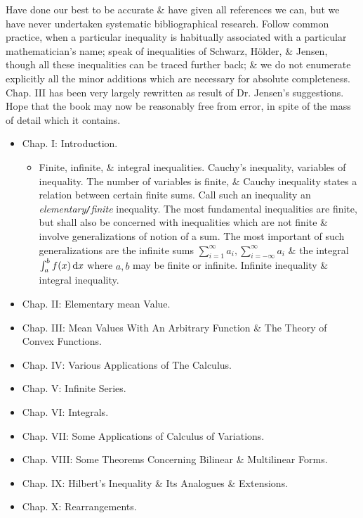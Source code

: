 \documentclass{article}
\begin{document}
\begin{enumerate}
	Have done our best to be accurate \& have given all references we can, but we have never undertaken systematic bibliographical research. Follow common practice, when a particular inequality is habitually associated with a particular mathematician's name; speak of inequalities of {\sc Schwarz, H\"older, \& Jensen}, though all these inequalities can be traced further back; \& we do not enumerate explicitly all the minor additions which are necessary for absolute completeness. Chap. III has been very largely rewritten as result of Dr. {\sc Jensen}'s suggestions. Hope that the book may now be reasonably free from error, in spite of the mass of detail which it contains.
	\begin{itemize}
		\item {\sf Chap. I: Introduction.}
		\begin{itemize}
			\item {\sf Finite, infinite, \& integral inequalities.} Cauchy's inequality, variables of inequality. The number of variables is finite, \& Cauchy inequality states a relation between certain finite sums. Call such an inequality an {\it elementary{\tt/}finite} inequality. The most fundamental inequalities are finite, but shall also be concerned with inequalities which are not finite \& involve generalizations of notion of a sum. The most important of such generalizations are the infinite sums $\sum_{i=1}^\infty a_i,\sum_{i=-\infty}^\infty a_i$ \& the integral $\int_a^b f(x)\,{\rm d}x$ where $a,b$ may be finite or infinite. Infinite inequality \& integral inequality.
		\end{itemize}
		\item {\sf Chap. II: Elementary mean Value.}
		\item {\sf Chap. III: Mean Values With An Arbitrary Function \& The Theory of Convex Functions.}
		\item {\sf Chap. IV: Various Applications of The Calculus.}
		\item {\sf Chap. V: Infinite Series.}
		\item {\sf Chap. VI: Integrals.}
		\item {\sf Chap. VII: Some Applications of Calculus of Variations.}
		\item {\sf Chap. VIII: Some Theorems Concerning Bilinear \& Multilinear Forms.}
		\item {\sf Chap. IX: Hilbert's Inequality \& Its Analogues \& Extensions.}
		\item {\sf Chap. X: Rearrangements.}
	\end{itemize}
	

\end{enumerate}
\end{document}
